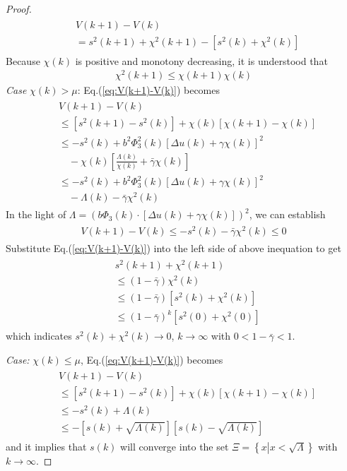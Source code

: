 \documentclass[10pt,onecolumn,draftcls]{IEEEtran}
\begin{document}
\begin{proof}
\begin{align}
\begin{split}
	&V(k+1)-V(k) \\
	&= s^2(k+1)+\chi^2(k+1)-\left[s^2(k)+\chi^2(k)\right]
\end{split}\end{align}
Because $\chi(k)$ is positive and monotony decreasing, it is understood that
\begin{align}
	\chi^2(k+1)\le\chi(k+1)\chi(k) 
\end{align}  
{\it Case} $\chi(k)>\mu$: Eq.(\ref{eq:V(k+1)-V(k)}) becomes
\begin{align}\begin{split} 
	&V(k+1)-V(k) \\
	&\le \left[s^2(k+1)-s^2(k)\right]+\chi(k)\left[\chi(k+1)-\chi(k)\right]\\
	&\le -s^2(k)+b^2\Phi_3^2(k)\left[\Delta u(k)+\gamma\chi(k)\right]^2\\
	&\quad-\chi(k)\left[\frac{\Lambda(k)}{\chi(k)}+\bar\gamma\chi(k)\right]\\
	&\le -s^2(k)+b^2\Phi_3^2(k)\left[\Delta u(k)+\gamma\chi(k)\right]^2\\
	&\quad-\Lambda(k)-\bar\gamma\chi^2(k)
\end{split}\end{align}
In the light of $\Lambda =\left(b\Phi_3(k)\cdot\left[\Delta u(k)+\gamma\chi(k)\right]\right)^2$, we can establish
\begin{align}\begin{split}
	V(k+1)-V(k) \le -s^2(k)-\bar\gamma\chi^2(k)\le 0
\end{split}\end{align}
Substitute Eq.(\ref{eq:V(k+1)-V(k)}) into the left side of above inequation to get
\begin{align}\begin{split}
	&s^2(k+1)+\chi^2(k+1)\\
	&\le(1-\bar\gamma)\chi^2(k)\\
	&\le(1-\bar\gamma)\left[s^2(k)+\chi^2(k)\right]\\
	&\le(1-\bar\gamma)^k\left[s^2(0)+\chi^2(0)\right]
\end{split}\end{align}
which indicates $s^2(k)+\chi^2(k)\to 0$, $k\to \infty$ with $0<1-\bar\gamma<1$.

{\it Case:} $\chi(k)\le\mu$, Eq.(\ref{eq:V(k+1)-V(k)}) becomes
\begin{align}\begin{split}
	&V(k+1)-V(k) \\
	&\le \left[s^2(k+1)-s^2(k)\right]+\chi(k)\left[\chi(k+1)-\chi(k)\right]\\
	&\le -s^2(k)+\Lambda(k)\\
	&\le -\left[s(k)+\sqrt{\Lambda(k)}\right]\left[s(k)-\sqrt{\Lambda(k)}\right]
\end{split}\end{align}
and it implies that $s(k)$ will converge into the set $\Xi=\left\{x\left\vert x<\sqrt{\Lambda}\right.\right\}$ with $k\to\infty$.


\end{proof}
\end{document}
